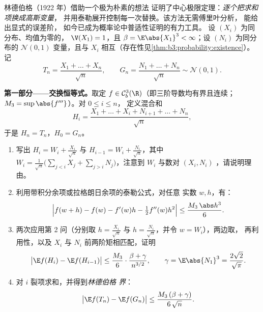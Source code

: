 \begin{problem}
\label{pb:b3:clt:1}
林德伯格（1922 年）借助一个极为朴素的想法
证明了中心极限定理：\emph{逐个把求和项换成高斯变量}，
并用泰勒展开控制每一次替换。该方法无需傅里叶分析，
能给出显式的误差阶，
如今已成为概率论中普适性证明的有力工具。
设 $(X_i)$ 为同分布、均值为零的，
$\V(X_1) = 1$，且 $\beta = \E\abs{X_1}^3 < \infty$；设
$(N_i)$ 为同分布的 $\mathcal N(0,1)$ 变量，且与
$X_i$ 相互（存在性见\cref{thm:b3:probability:existence}）。记
\[
T_n = \frac{X_1 + \dots + X_n}{\sqrt n},
\qquad
G_n = \frac{N_1 + \dots + N_n}{\sqrt n} \sim \mathcal N(0,1).
\]

\medskip
\noindent\textbf{第一部分——交换恒等式。}取定 $f
\in \mathcal C^3_b(\R)$（即三阶导数均有界且连续；
$M_3 = \sup\abs{f'''}$）。对 $0 \leq i \leq n$，
定义混合和
\[
H_i = \frac{X_1 + \dots + X_i + N_{i+1} + \dots +
N_n}{\sqrt n},
\]
于是 $H_n = T_n$，$H_0 = G_n$。
\begin{enumerate}
  \item 写出 $H_i = W_i + \frac{X_i}{\sqrt n}$ 与 $H_{i-1}
        = W_i + \frac{N_i}{\sqrt n}$，其中 $W_i =
        \frac{1}{\sqrt n}\bigl(\sum_{j<i}X_j +
        \sum_{j>i}N_j\bigr)$，注意到 $W_i$
        与数对 $(X_i, N_i)$ ，请说明理由。
  \item 利用带积分余项或拉格朗日余项的泰勒公式，对任意
        实数 $w, h$，有：
        \[
        \Bigl|f(w + h) - f(w) - f'(w)h -
        \tfrac12f''(w)h^2\Bigr| \leq
        \frac{M_3\,\abs h^3}{6} .
        \]
  \item 两次应用第 2 问（分别取 $h = \frac{X_i}{\sqrt n}$ 与
        $h = \frac{N_i}{\sqrt n}$，并令 $w = W_i$），两边取，
        再利用性，以及
        $X_i$ 与 $N_i$ 前两阶矩相匹配，证明
        \[
        \bigl|\E f(H_i) - \E f(H_{i-1})\bigr|
        \leq \frac{M_3}{6}\cdot
        \frac{\beta + \gamma}{n^{3/2}},
        \qquad \gamma = \E\abs{N_1}^3 =
        \frac{2\sqrt2}{\sqrt\pi} .
        \]
  \item 对 $i$ 裂项求和，并得到\emph{林德伯格
        界}：
        \[
        \bigl|\E f(T_n) - \E f(G_n)\bigr| \leq
        \frac{M_3\,(\beta + \gamma)}{6\,\sqrt n} .
        \]
\end{enumerate}


\end{problem}
